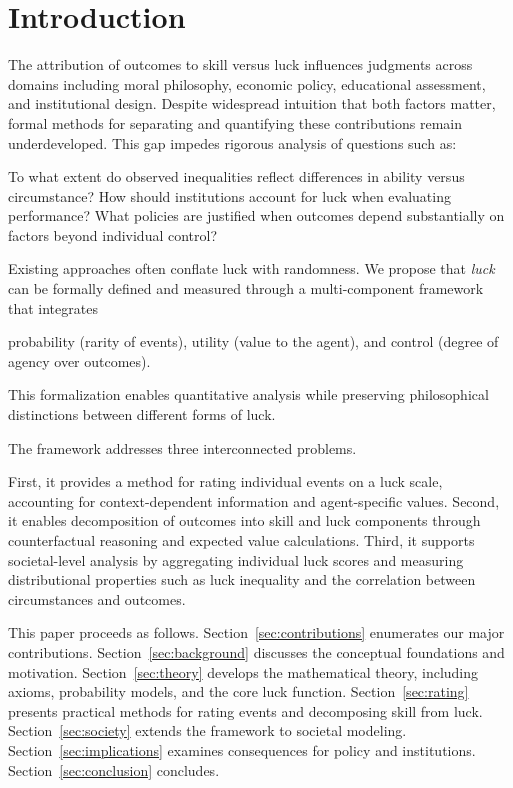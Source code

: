 \setcounter{tocdepth}{1}
\tableofcontents

\section{Introduction}

The attribution of outcomes to skill versus luck influences judgments across
domains including moral philosophy, economic policy, educational assessment,
and institutional design. Despite widespread intuition that both factors
matter, formal methods for separating and quantifying these
contributions remain underdeveloped. This gap impedes rigorous analysis of
questions such as:

To what extent do observed inequalities reflect
differences in ability versus circumstance? How should institutions account
for luck when evaluating performance? What policies are justified when
outcomes depend substantially on factors beyond individual control?

Existing approaches often conflate luck with randomness.
We propose that \emph{luck} can be formally defined and measured
through a multi-component framework that integrates 

probability (rarity
of events), utility (value to the agent), and control (degree of agency
over outcomes).

This formalization enables quantitative analysis while preserving philosophical
distinctions between different forms of luck.

The framework addresses three interconnected problems. 

First, it
provides a method for rating individual events on a luck scale, accounting
for context-dependent information and agent-specific values. Second, it enables
decomposition of outcomes into skill and luck components through counterfactual
reasoning and expected value calculations. Third, it supports societal-level
analysis by aggregating individual luck scores and measuring distributional
properties such as luck inequality and the correlation between circumstances
and outcomes.

This paper proceeds as follows. Section~\ref{sec:contributions}
enumerates our major contributions. Section~\ref{sec:background} discusses
the conceptual foundations and motivation. Section~\ref{sec:theory}
develops the mathematical theory, including axioms, probability models, and
the core luck function. Section~\ref{sec:rating} presents practical
methods for rating events and decomposing skill from luck. Section~\ref{sec:society}
extends the framework to societal modeling. Section~\ref{sec:implications}
examines consequences for policy and institutions. Section~\ref{sec:conclusion}
concludes.

